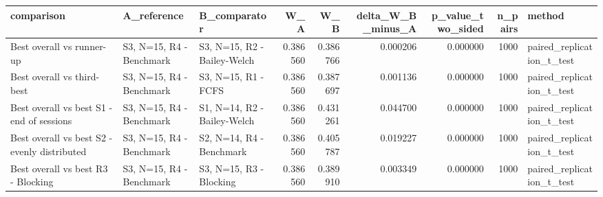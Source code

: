 \begin{tabular}{lllrrrrrl}
\toprule
comparison & A_reference & B_comparator & W_A & W_B & delta_W_B_minus_A & p_value_two_sided & n_pairs & method \\
\midrule
Best overall vs runner-up & S3, N=15, R4 - Benchmark & S3, N=15, R2 - Bailey-Welch & 0.386560 & 0.386766 & 0.000206 & 0.000000 & 1000 & paired_replication_t_test \\
Best overall vs third-best & S3, N=15, R4 - Benchmark & S3, N=15, R1 - FCFS & 0.386560 & 0.387697 & 0.001136 & 0.000000 & 1000 & paired_replication_t_test \\
Best overall vs best S1 - end of sessions & S3, N=15, R4 - Benchmark & S1, N=14, R2 - Bailey-Welch & 0.386560 & 0.431261 & 0.044700 & 0.000000 & 1000 & paired_replication_t_test \\
Best overall vs best S2 - evenly distributed & S3, N=15, R4 - Benchmark & S2, N=14, R4 - Benchmark & 0.386560 & 0.405787 & 0.019227 & 0.000000 & 1000 & paired_replication_t_test \\
Best overall vs best R3 - Blocking & S3, N=15, R4 - Benchmark & S3, N=15, R3 - Blocking & 0.386560 & 0.389910 & 0.003349 & 0.000000 & 1000 & paired_replication_t_test \\
\bottomrule
\end{tabular}
